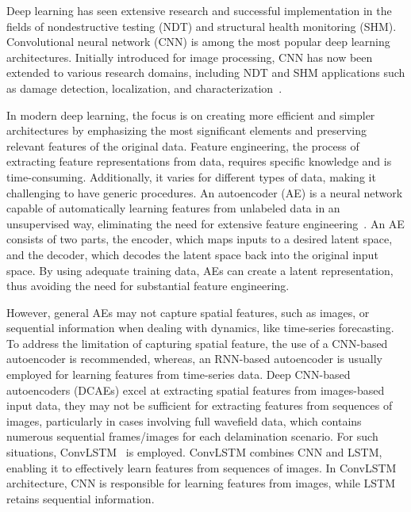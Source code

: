 Deep learning has seen extensive research and successful implementation in the 
fields of nondestructive testing (NDT) and structural health monitoring (SHM). 
Convolutional neural network (CNN) is among the most popular deep learning 
architectures. Initially introduced for image processing, CNN has now been 
extended to various research domains, including NDT and SHM applications such 
as damage detection, localization, and characterization~\cite{rautela2019deep, 
	pandey2022explainable, ijjeh2021full, ijjeh2022deep}.

In modern deep learning, the focus is on creating more efficient and simpler 
architectures by emphasizing the most significant elements and preserving 
relevant features of the original data. Feature engineering, the process of 
extracting feature representations from data, requires specific knowledge and 
is time-consuming. Additionally, it varies for different types of data, making 
it challenging to have generic procedures. An autoencoder (AE) is a neural 
network capable of automatically learning features from unlabeled data in an 
unsupervised way, eliminating the need for extensive feature 
engineering~\cite{pinaya2020autoencoders}. 
An AE consists of two parts, the encoder, which maps inputs to a desired latent 
space, and the decoder, which decodes the latent space back into the original 
input space. By using adequate training data, AEs can create a latent 
representation, thus avoiding the need for substantial feature engineering.

However, general AEs may not capture spatial features, such as images, or 
sequential information when dealing with dynamics, like time-series 
forecasting. To address the limitation of capturing spatial feature, the use of 
a CNN-based autoencoder is recommended, whereas, an RNN-based autoencoder is 
usually employed for learning features from time-series data.
Deep CNN-based autoencoders (DCAEs) excel at extracting spatial features from 
images-based input data, they may not be sufficient for extracting features 
from sequences of images, particularly in cases involving full wavefield data, 
which contains numerous sequential frames/images for each delamination 
scenario. 
For such situations, ConvLSTM~\cite{shi2015convolutional} is 
employed. ConvLSTM combines CNN and LSTM, enabling it to effectively learn 
features from sequences of images. In ConvLSTM architecture, CNN is responsible 
for learning features from images, while LSTM retains sequential information.

